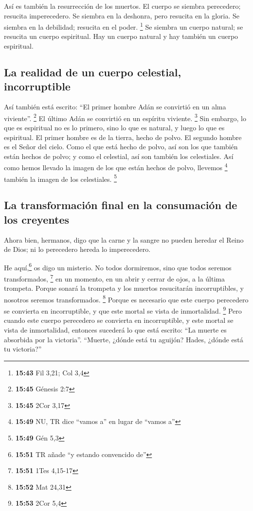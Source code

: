 \begin{paracol}{2}
 Así es también la resurrección de los muertos. El cuerpo
se siembra perecedero; resucita imperecedero.  Se siembra
en la deshonra, pero resucita en la gloria. Se siembra en la debilidad;
resucita en el poder. \footnote{\textbf{15:43} Fil 3,21; Col 3,4}
 Se siembra un cuerpo natural; se resucita un cuerpo
espiritual. Hay un cuerpo natural y hay también un cuerpo espiritual.

\hypertarget{la-realidad-de-un-cuerpo-celestial-incorruptible}{%
\subsection{La realidad de un cuerpo celestial,
incorruptible}\label{la-realidad-de-un-cuerpo-celestial-incorruptible}}

 Así también está escrito: ``El primer hombre Adán se
convirtió en un alma viviente''. \footnote{\textbf{15:45} Génesis 2:7}
El último Adán se convirtió en un espíritu viviente. \footnote{\textbf{15:45}
  2Cor 3,17}  Sin embargo, lo que es espiritual no es lo
primero, sino lo que es natural, y luego lo que es espiritual.
 El primer hombre es de la tierra, hecho de polvo. El
segundo hombre es el Señor del cielo.  Como el que está
hecho de polvo, así son los que también están hechos de polvo; y como el
celestial, así son también los celestiales.  Así como
hemos llevado la imagen de los que están hechos de polvo, llevemos
\footnote{\textbf{15:49} NU, TR dice ``vamos a'' en lugar de ``vamos a''}
también la imagen de los celestiales. \footnote{\textbf{15:49} Gén 5,3}

\hypertarget{la-transformaciuxf3n-final-en-la-consumaciuxf3n-de-los-creyentes}{%
\subsection{La transformación final en la consumación de los
creyentes}\label{la-transformaciuxf3n-final-en-la-consumaciuxf3n-de-los-creyentes}}

 Ahora bien, hermanos, digo que la carne y la sangre no
pueden heredar el Reino de Dios; ni lo perecedero hereda lo
imperecedero.

 He aquí,\footnote{\textbf{15:51} TR añade ``y estando
  convencido de''} os digo un misterio. No todos dormiremos, sino que
todos seremos transformados, \footnote{\textbf{15:51} 1Tes 4,15-17}
 en un momento, en un abrir y cerrar de ojos, a la última
trompeta. Porque sonará la trompeta y los muertos resucitarán
incorruptibles, y nosotros seremos transformados. \footnote{\textbf{15:52}
  Mat 24,31}  Porque es necesario que este cuerpo
perecedero se convierta en incorruptible, y que este mortal se vista de
inmortalidad. \footnote{\textbf{15:53} 2Cor 5,4}  Pero
cuando este cuerpo perecedero se convierta en incorruptible, y este
mortal se vista de inmortalidad, entonces sucederá lo que está escrito:
``La muerte es absorbida por la victoria''.  ``Muerte,
¿dónde está tu aguijón? Hades, ¿dónde está tu victoria?''


\end{paracol}
